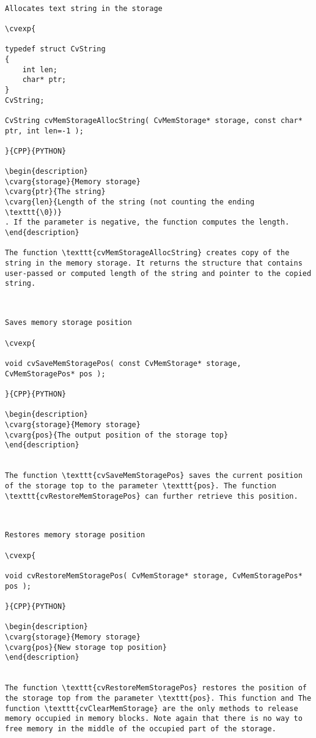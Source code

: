 \begin{verbatim}

Allocates text string in the storage

\cvexp{

typedef struct CvString
{
    int len;
    char* ptr;
}
CvString;

CvString cvMemStorageAllocString( CvMemStorage* storage, const char* ptr, int len=-1 );

}{CPP}{PYTHON}

\begin{description}
\cvarg{storage}{Memory storage}
\cvarg{ptr}{The string}
\cvarg{len}{Length of the string (not counting the ending \texttt{\0})}
. If the parameter is negative, the function computes the length.
\end{description}

The function \texttt{cvMemStorageAllocString} creates copy of the string in the memory storage. It returns the structure that contains user-passed or computed length of the string and pointer to the copied string.


\end{verbatim}
\begin{verbatim}

Saves memory storage position

\cvexp{

void cvSaveMemStoragePos( const CvMemStorage* storage, CvMemStoragePos* pos );

}{CPP}{PYTHON}

\begin{description}
\cvarg{storage}{Memory storage}
\cvarg{pos}{The output position of the storage top}
\end{description}


The function \texttt{cvSaveMemStoragePos} saves the current position of the storage top to the parameter \texttt{pos}. The function \texttt{cvRestoreMemStoragePos} can further retrieve this position.


\end{verbatim}
\begin{verbatim}

Restores memory storage position

\cvexp{

void cvRestoreMemStoragePos( CvMemStorage* storage, CvMemStoragePos* pos );

}{CPP}{PYTHON}

\begin{description}
\cvarg{storage}{Memory storage}
\cvarg{pos}{New storage top position}
\end{description}


The function \texttt{cvRestoreMemStoragePos} restores the position of the storage top from the parameter \texttt{pos}. This function and The function \texttt{cvClearMemStorage} are the only methods to release memory occupied in memory blocks. Note again that there is no way to free memory in the middle of the occupied part of the storage.


\end{verbatim}
